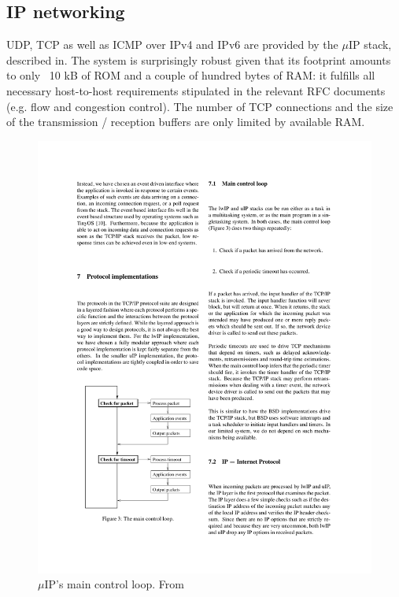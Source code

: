 \documentclass[final,a4paper,twoside,11pt,onecolumn]{report}
\begin{document}




\subsection{IP networking}
UDP, TCP as well as ICMP over IPv4 and IPv6 are provided by the $\mu$IP stack, described in\cite{dunkels2003full}. The system is surprisingly robust given that its footprint amounts to only ~10 kB of ROM and a couple of hundred bytes of RAM: it fulfills all necessary host-to-host requirements stipulated in the relevant RFC documents\citep[p.4]{dunkels2003full} (e.g. flow and congestion control). The number of TCP connections and the size of the transmission / reception buffers are only limited by available RAM.

\begin{figure}
   \centering
   \includegraphics[width=.5\linewidth]{dunkels-uip-main_loop}
   \caption{$\mu$IP's main control loop. From \citep[p.6]{dunkels2003full}}
   \label{fig:uip-ml}
\end{figure}
\end{document}
